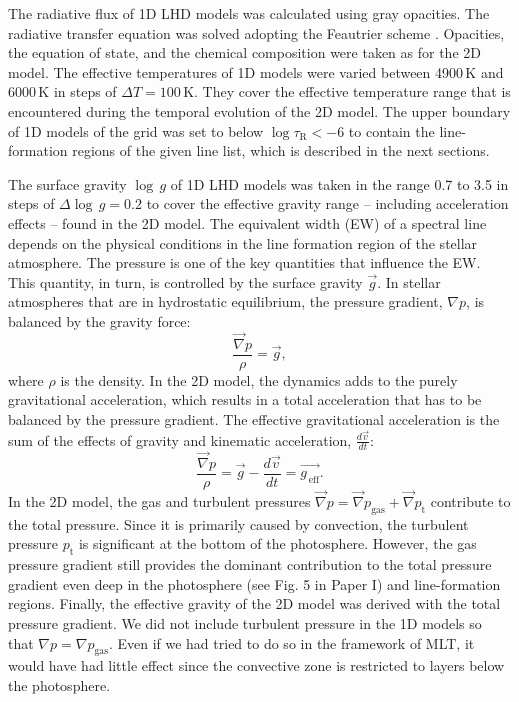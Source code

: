 \documentclass{aa}
\begin{document}
The radiative flux of 1D LHD models was calculated using gray opacities.
The radiative transfer equation was solved adopting the Feautrier
scheme \citep{1964SAOSR.167...80F}.  Opacities, the equation of state, and
the chemical composition were taken as for the 2D model.  The effective
temperatures of 1D models were varied between 4900\,K and 6000\,K in steps
of $\Delta T=100$\,K. They cover the effective temperature range that is
encountered during the temporal evolution of the 2D model.  The upper boundary
of  1D models of the grid was set to below $\log\tau_\mathrm{R}<-6$ to
contain the line-formation regions of the given line list, which is
described in the next sections.

The surface gravity $\log\,g$ of  1D LHD models was taken in the range 0.7 to
3.5  in steps of $\Delta\log\,g=0.2$ to cover the effective gravity
range -- including acceleration effects -- found in the 2D model. The
equivalent width (EW) of a spectral line depends on the physical conditions in the
line formation region of the stellar atmosphere.  The pressure is one of the
key quantities that influence the EW. This quantity, in turn, is
controlled by the surface gravity $\vec{g}$.  In stellar
atmospheres that are in  hydrostatic equilibrium, the pressure gradient, $\nabla p$, 
is balanced by the gravity force:
%
\begin{equation}
\frac{\vec{\nabla} p}{\rho}=\vec{g},
\end{equation}
%
where $\rho$ is the density.  In the 2D model, the dynamics adds to the purely
gravitational acceleration, which results in a total acceleration
that  has to be
balanced by the pressure gradient.  The effective
gravitational acceleration  is the sum of the effects of gravity and
kinematic acceleration, $\frac{d\vec{v}}{dt}$:
%
\begin{equation}
\frac{\vec{\nabla} p}{\rho}=\vec{g}-\frac{d\vec{v}}{dt}=\vec{g_\mathrm{\,eff}}.
\label{2ndlaw}
\end{equation}
%
In the 2D model, the 
gas and turbulent pressures  
$\vec{\nabla} p=\vec{\nabla} p_\mathrm{gas} + \vec{\nabla} p_\mathrm{t}$
contribute to the total pressure.
Since it is primarily caused by convection, the turbulent pressure $p_\mathrm{t}$ is
significant at the bottom of the photosphere. However,
the gas pressure gradient still provides the dominant contribution to the total pressure gradient even 
deep in the photosphere (see Fig. 5 in Paper I) and line-formation regions. 
Finally, the  effective gravity  
of the 2D model was  derived with the total pressure gradient.
We did not include turbulent pressure in the 1D models so that
$\nabla p=\nabla p_\mathrm{gas}$. Even if we had tried to do so in the
framework of MLT, it would have  had little effect since the convective zone is
restricted to layers below the photosphere. 
\end{document}
